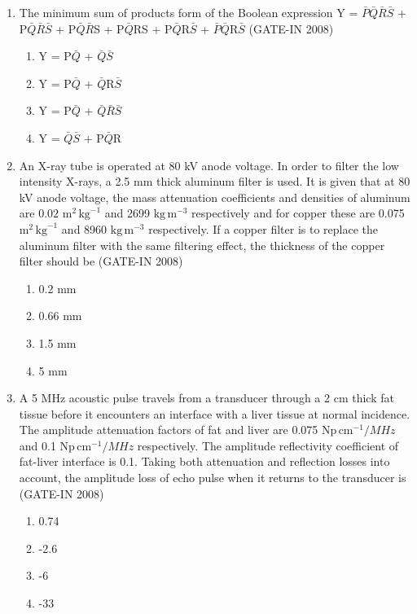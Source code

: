 \documentclass[journal,12pt,onecolumn]{IEEEtran}
\theoremstyle{remark}
\begin{document}
\begin{enumerate}
    \item  The minimum sum of products form of the Boolean expression Y = $\bar{P}$$\bar{Q}$$\bar{R}$$\bar{S}$ + P$\bar{Q}$$\bar{R}$$\bar{S}$ + P$\bar{Q}$$\bar{R}$S + P$\bar{Q}$RS + P$\bar{Q}$R$\bar{S}$ + $\bar{P}$$\bar{Q}$R$\bar{S}$ \hfill{(GATE-IN 2008)}
    \begin{multicols}{2}
    \begin{enumerate} 
        \item  Y = P$\bar{Q}$ + $\bar{Q}$$\bar{S}$
        \item  Y = P$\bar{Q}$ + $\bar{Q}$R$\bar{S}$
        \item  Y = P$\bar{Q}$ + $\bar{Q}$$\bar{R}$$\bar{S}$
        \item  Y = $\bar{Q}$$\bar{S}$ + P$\bar{Q}$R
    \end{enumerate}
    \end{multicols}
    
    \item An X-ray tube is operated at 80 kV anode voltage. In order to filter the low intensity X-rays, a
2.5 mm thick aluminum filter is used. It is given that at 80 kV anode voltage, the mass attenuation
coefficients and densities of aluminum are $0.02$ $\text{m}^{2}\,\text{kg}^{-1}$ and 2699 $\text{kg}\,\text{m}^{-3}$ respectively and for copper
these are 0.075 $\text{m}^{2}\,\text{kg}^{-1}$ and 8960 $\text{kg}\,\text{m}^{-3}$ respectively. If a copper filter is to replace the aluminum
filter with the same filtering effect, the thickness of the copper filter should be \hfill{(GATE-IN 2008)}
\begin{multicols}{4}
    \begin{enumerate} 
        \item 0.2 mm
        \item 0.66 mm
        \item 1.5 mm
        \item 5 mm
    \end{enumerate}
    \end{multicols}
    
    
    
    \item A 5 MHz acoustic pulse travels from a transducer through a 2 cm thick fat tissue before it
encounters an interface with a liver tissue at normal incidence. The amplitude attenuation factors of
fat and liver are 0.075 $\text{Np}\,\text{cm}^{-1}/MHz$ and 0.1 $\text{Np}\,\text{cm}^{-1}/MHz$ respectively. The amplitude reflectivity
coefficient of fat-liver interface is 0.1. Taking both attenuation and reflection losses into account,
the amplitude loss  of echo pulse when it returns to the transducer is
 \hfill{(GATE-IN 2008)}
 \begin{multicols}{4}
  \begin{enumerate} 
        \item 0.74
        \item -2.6
        \item -6
        \item -33
\end{enumerate}
\end{multicols}


\end{enumerate}
\end{document}
